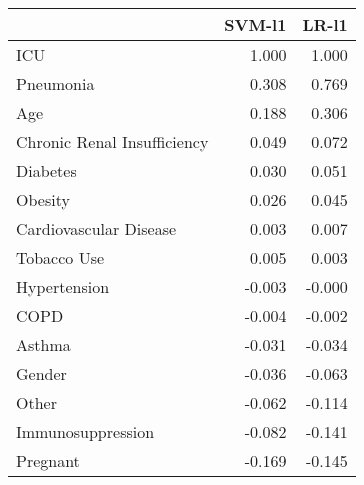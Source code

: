 \begin{tabular}{lrr}
\toprule
{} &  SVM-l1 &  LR-l1 \\
\midrule
ICU                         &   1.000 &  1.000 \\
Pneumonia                   &   0.308 &  0.769 \\
Age                         &   0.188 &  0.306 \\
Chronic Renal Insufficiency &   0.049 &  0.072 \\
Diabetes                    &   0.030 &  0.051 \\
Obesity                     &   0.026 &  0.045 \\
Cardiovascular Disease      &   0.003 &  0.007 \\
Tobacco Use                 &   0.005 &  0.003 \\
Hypertension                &  -0.003 & -0.000 \\
COPD                        &  -0.004 & -0.002 \\
Asthma                      &  -0.031 & -0.034 \\
Gender                      &  -0.036 & -0.063 \\
Other                       &  -0.062 & -0.114 \\
Immunosuppression           &  -0.082 & -0.141 \\
Pregnant                    &  -0.169 & -0.145 \\
\bottomrule
\end{tabular}

